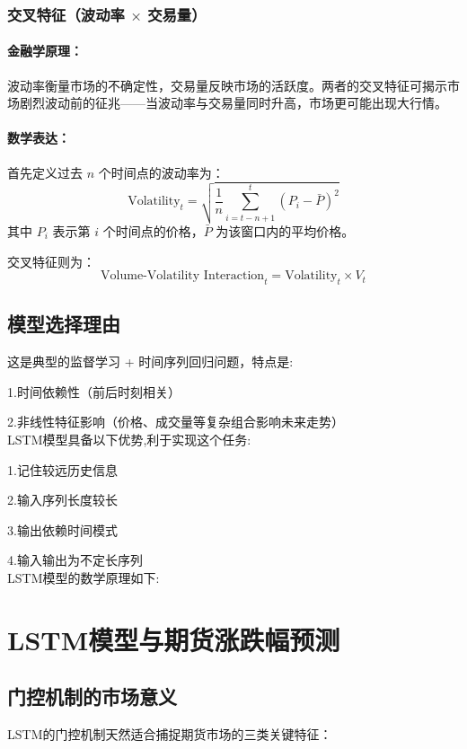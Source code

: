 \documentclass[a4paper,12pt]{ctexart}
\begin{document}
\subsubsection{交叉特征（波动率 $\times$ 交易量）}

\paragraph{金融学原理：}

波动率衡量市场的不确定性，交易量反映市场的活跃度。两者的交叉特征可揭示市场剧烈波动前的征兆——当波动率与交易量同时升高，市场更可能出现大行情。

\paragraph{数学表达：}

首先定义过去 $n$ 个时间点的波动率为：
\[
\text{Volatility}_t = \sqrt{\frac{1}{n} \sum_{i=t-n+1}^{t} (P_i - \bar{P})^2}
\]
其中 $P_i$ 表示第 $i$ 个时间点的价格，$\bar{P}$ 为该窗口内的平均价格。

交叉特征则为：
\[
\text{Volume-Volatility Interaction}_t = \text{Volatility}_t \times V_t
\]

\newpage
\subsection{模型选择理由}

这是典型的监督学习 + 时间序列回归问题，特点是:

1.时间依赖性（前后时刻相关）

2.非线性特征影响（价格、成交量等复杂组合影响未来走势）\\

LSTM模型具备以下优势,利于实现这个任务:

1.记住较远历史信息

2.输入序列长度较长

3.输出依赖时间模式

4.输入输出为不定长序列\\

LSTM模型的数学原理如下:

\section*{LSTM模型与期货涨跌幅预测}
\subsection*{门控机制的市场意义}
LSTM的门控机制天然适合捕捉期货市场的三类关键特征：
\end{document}
